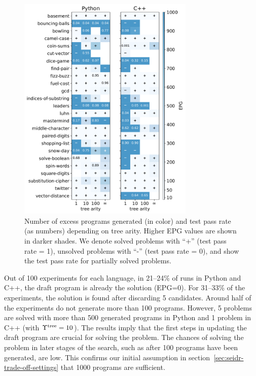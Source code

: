\begin{figure}
  \centering
  \includegraphics[width=0.75\textwidth, trim={3mm 1.6mm 3mm 2mm}, clip]{images/num_programs_generated_vs_bf_test_pass_rate_vertical_maxprog_1000_v3.pdf}
  \caption{Number of excess programs generated (in color) and test pass rate (as numbers) depending on tree arity. Higher EPG values are shown in darker shades. We denote solved problems with ``+'' (test pass rate = 1), unsolved problems with ``-'' (test pass rate = 0), and show the test pass rate for partially solved problems. }
  \label{fig:seidr:epg-bf}
\end{figure}

Out of 100 experiments for each language, in 21--24\% of runs in Python and C++, the draft program is already the solution (EPG=0). 
For 31--33\% of the experiments, the solution is found after discarding 5 candidates. 
Around half of the experiments do not generate more than 100 programs. 
However, 5 problems are solved with more than 500 generated programs in Python and 1 problem in C++ (with $\Upsilon^\text{tree}=10$).
The results imply that the first steps in updating the draft program are crucial for solving the problem. 
The chances of solving the problem in later stages of the search, such as after 100 programs have been generated, are low.
This confirms our initial assumption in section~\ref{sec:seidr-trade-off-settings} that 1000 programs are sufficient.

